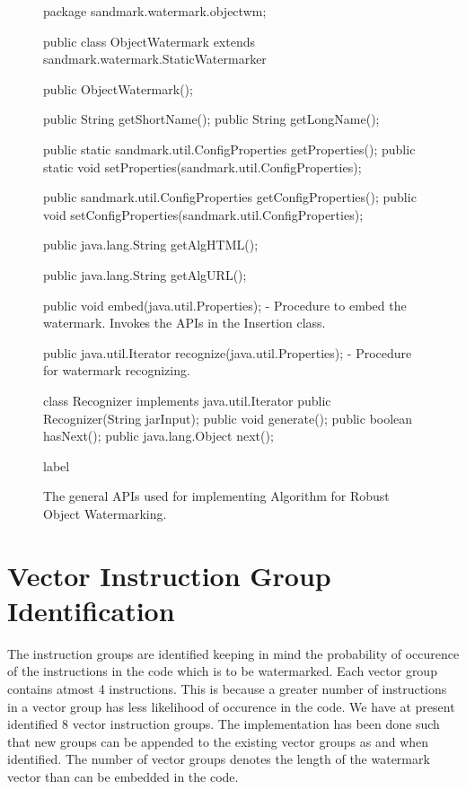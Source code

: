 \begin{figure}
\begin{listing}{1}
package sandmark.watermark.objectwm;

public class ObjectWatermark extends sandmark.watermark.StaticWatermarker {

   public ObjectWatermark();

   public String getShortName();
   public String getLongName();

   public static sandmark.util.ConfigProperties getProperties();
   public static void setProperties(sandmark.util.ConfigProperties);

   public sandmark.util.ConfigProperties getConfigProperties();
   public void setConfigProperties(sandmark.util.ConfigProperties);

   public java.lang.String getAlgHTML();

   public java.lang.String getAlgURL();

   public void embed(java.util.Properties);
      - Procedure to embed the watermark. Invokes the APIs in the Insertion class.

   public java.util.Iterator recognize(java.util.Properties);
      - Procedure for watermark recognizing.

   class Recognizer implements java.util.Iterator {
      public Recognizer(String jarInput);
      public void generate();
      public boolean hasNext();
      public java.lang.Object next();
   }
}
\end{listing}
\caption{The general APIs used for implementing Algorithm for Robust Object Watermarking.}
label{}
\end{figure}


\section{Vector Instruction Group Identification }
The instruction groups are identified keeping in mind the probability
of occurence of the instructions in the code which is to be watermarked. Each 
vector group contains atmost 4 instructions. This is because a greater number of
instructions in a vector group has less likelihood of occurence in the code. We
have at present identified 8 vector instruction groups. The implementation has 
been done such that new groups can be appended to the existing vector groups as
and when identified. The number of vector groups denotes the length of the
watermark vector  than can be embedded in the code.

